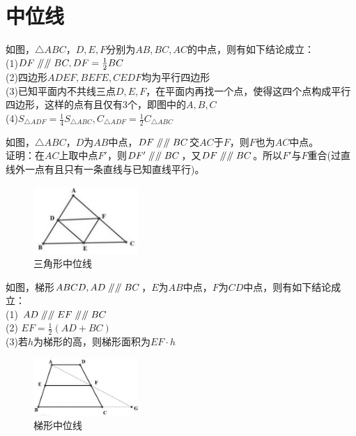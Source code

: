 \documentclass{ecnuthesis}
\newcommand\px{\mathrel{/\mkern-5mu/}}  %
\begin{document}
\section{中位线}
\begin{knowledge}
    如图，$\triangle ABC$，$D,E,F$分别为$AB,BC,AC$的中点，则有如下结论成立：\\
    (1)$DF\px\px BC,DF=\frac{1}{2}BC$ \\
    (2)四边形$ADEF,BEFE,CEDF$均为平行四边形 \\
    (3)已知平面内不共线三点$D,E,F$，在平面内再找一个点，使得这四个点构成平行四边形，这样的点有且仅有3个，即图中的$A,B,C$ \\
    (4)$S_{\triangle ADF}=\frac{1}{4}S_{\triangle ABC},C_{\triangle ADF}=\frac{1}{2}C_{\triangle ABC}$ \\
\end{knowledge}
\begin{corollary}
    如图，$\triangle ABC$，$D$为$AB$中点，$DF \px \px BC$交$AC$于$F$，则$F$也为$AC$中点。\\
    证明：在$AC$上取中点$F'$，则$DF'\px \px BC$，又$DF\px \px BC$。所以$F'$与$F$重合(过直线外一点有且只有一条直线与已知直线平行)。
\end{corollary}
\begin{figure}[H]
\centering
\includegraphics[width=4cm]{picture/693.png}
\caption{三角形中位线}
\end{figure}
\begin{knowledge}
    如图，梯形$ABCD,AD\px \px BC$，$E$为$AB$中点，$F$为$CD$中点，则有如下结论成立：\\
    (1) $AD \px \px EF \px \px BC$ \\
    (2) $EF=\frac{1}{2}(AD+BC)$ \\
    (3)若$h$为梯形的高，则梯形面积为$EF·h$ \\
\end{knowledge}
\begin{figure}[H]
\centering
\includegraphics[width=4cm]{picture/694.png}
\caption{梯形中位线}
\end{figure}
\end{document}
